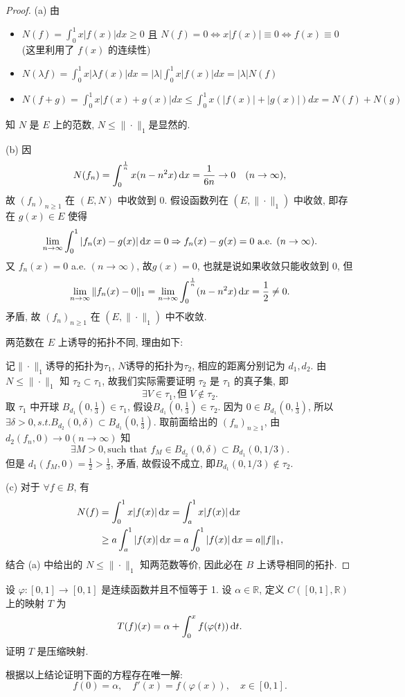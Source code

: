 \begin{proof}
(a) 由
\begin{itemize}
\item $N(f)=\int_0^1x|f(x)|dx\geq 0$ 且 $N(f)=0\Leftrightarrow x|f(x)|\equiv 0\Leftrightarrow f(x)\equiv 0$ (这里利用了 $f(x)$ 的连续性)
\item $N(\lambda f)=\int_0^1x|\lambda f(x)|dx=|\lambda|\int_0^1x|f(x)|dx=|\lambda|N(f)$
\item $N(f+g)=\int_0^1x|f(x)+g(x)|dx\leq \int_0^1x(|f(x)|+|g(x)|)dx=N(f)+N(g)$
\end{itemize}
知 $N$ 是 $E$ 上的范数, $N\leq\|\cdot\|_1$是显然的.

(b) 因
\[N(f_n)=\int_0^{\frac{1}{n}}x(n-n^2x)\mathop{}\!\mathrm{d} x=\frac{1}{6n}\rightarrow 0\quad (n\to\infty),\]
故 $(f_n)_{n\geq 1}$ 在 $(E,N)$ 中收敛到 $0$. 
假设函数列在 $(E,\|\cdot\|_1)$ 中收敛, 即存在 $g(x)\in E$ 使得
\[\lim_{n\to\infty}\int_0^1|f_n(x)-g(x)|\mathop{}\!\mathrm{d} x=0\Rightarrow f_n(x)-g(x)=0\text{ a.e. }(n\to\infty).\]
又 $f_n(x)=0$ a.e. $(n\to\infty)$, 故$g(x)=0$, 也就是说如果收敛只能收敛到 0, 但
\[\lim_{n\to\infty}\|f_n(x)-0\|_1=\lim_{n\to\infty}\int_0^{\frac{1}{n}}(n-n^2x)\mathop{}\!\mathrm{d} x=\frac{1}{2}\neq 0.\]
矛盾, 故 $(f_n)_{n\geq 1}$ 在 $(E,\|\cdot\|_1)$ 中不收敛.

两范数在 $E$ 上诱导的拓扑不同, 理由如下:

记$\|\cdot\|_1$诱导的拓扑为$\tau_1$, $N$诱导的拓扑为$\tau_2$, 
相应的距离分别记为 $d_1,d_2$. 
由 $N\leq \|\cdot\|_1$ 知 $\tau_2\subset\tau_1$, 
故我们实际需要证明 $\tau_2$ 是 $\tau_1$ 的真子集, 即
\[\exists V\in\tau_1,\text{但}\;V\notin\tau_2.\]
取 $\tau_1$ 中开球 $B_{d_1}(0,\frac{1}{3})\in\tau_1$,
假设$B_{d_1}(0,\frac{1}{3})\in\tau_2$. 因为 $0\in B_{d_1}(0,\frac{1}{3})$, 
所以 $\exists\delta>0,s.t.B_{d_2}(0,\delta)\subset B_{d_1}(0,\frac{1}{3})$.
取前面给出的 $(f_n)_{n\geq 1}$, 由$d_2(f_n,0)\to 0(n\to\infty)$ 知
\[\exists M>0,\text{such that } f_M\in B_{d_2}(0,\delta)\subset B_{d_1}(0,1/3).\]
但是 $d_1(f_M,0)=\frac{1}{2}>\frac{1}{3}$, 矛盾, 故假设不成立, 即$B_{d_1}(0,1/3)\notin\tau_2$.

(c) 对于 $\forall f\in B$, 有 
\begin{align*}
    N(f) & =\int_0^1x|f(x)|\mathop{}\!\mathrm{d} x=\int_a^1 x|f(x)|\mathop{}\!\mathrm{d} x \\
         & \geq a\int_a^1|f(x)|\mathop{}\!\mathrm{d} x=a\int_0^1|f(x)|\mathop{}\!\mathrm{d} x=a\|f\|_1,
\end{align*} 
结合 (a) 中给出的 $N\leq\|\cdot\|_1$ 知两范数等价, 因此必在 $B$ 上诱导相同的拓扑.
\end{proof}


\begin{exercise}
     设 $\varphi:[0,1]\to[0,1]$ 是连续函数并且不恒等于 1. 设 $\alpha\in\mathbb{R}$, 定义 $C([0,1],\mathbb{R})$ 上的映射 $T$ 为
    \[T(f)(x)=\alpha+\int_0^xf(\varphi(t))\mathop{}\!\mathrm{d} t.\]
    证明 $T$ 是压缩映射.

    根据以上结论证明下面的方程存在唯一解:
    \[f(0)=\alpha,\quad f'(x)=f(\varphi(x)),\quad x\in[0,1].\]
\end{exercise}


